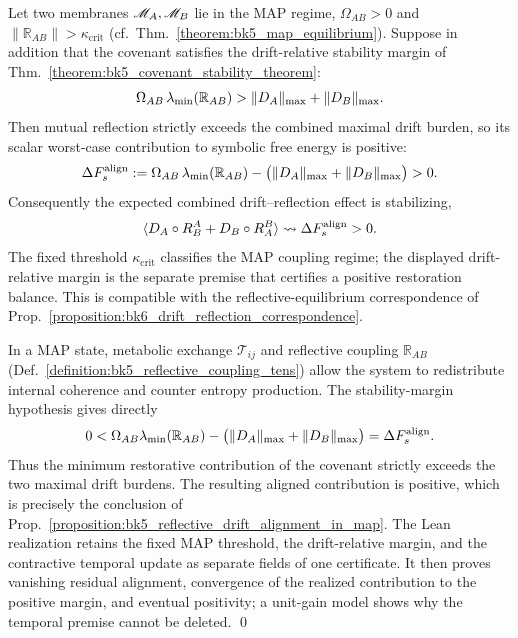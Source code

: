 \begin{proposition}
\label{proposition:bk5_reflective_drift_alignment_in_map}
Let two membranes $\mathscr{M}_A,\mathscr{M}_B$ lie in the MAP regime,
$\Omega_{AB}>0$ and $\|\mathbb{R}_{AB}\|>\kappa_{\mathrm{crit}}$
(cf.~Thm.~\ref{theorem:bk5_map_equilibrium}).  Suppose in addition that the
covenant satisfies the drift-relative stability margin of
Thm.~\ref{theorem:bk5_covenant_stability_theorem}:
\[
\Omega_{AB}\,\lambda_{\min}(\mathbb{R}_{AB})
>
\|D_A\|_{\max}+\|D_B\|_{\max}.
\]
Then mutual reflection strictly exceeds the combined maximal drift burden, so
its scalar worst-case contribution to symbolic free energy is positive:
\[
\Delta F_s^{\mathrm{align}}
:=\Omega_{AB}\,\lambda_{\min}(\mathbb{R}_{AB})
  -\bigl(\|D_A\|_{\max}+\|D_B\|_{\max}\bigr)>0.
\]
Consequently the expected combined drift--reflection effect is stabilizing,
\[
\langle D_A \circ R_B^A
      + D_B \circ R_A^B \rangle
\leadsto \Delta F_s^{\mathrm{align}}>0.
\]
The fixed threshold $\kappa_{\mathrm{crit}}$ classifies the MAP coupling
regime; the displayed drift-relative margin is the separate premise that
certifies a positive restoration balance.  This is compatible with the
reflective-equilibrium correspondence of
Prop.~\ref{proposition:bk6_drift_reflection_correspondence}.
\end{proposition}

\begin{demonstratio}
\label{demonstratio:bk5_entropy_reduction}
In a MAP state, metabolic exchange $\mathcal{T}_{ij}$ and reflective coupling
$\mathbb{R}_{AB}$ (Def.~\ref{definition:bk5_reflective_coupling_tens}) allow
the system to redistribute internal coherence and counter entropy production.
The stability-margin hypothesis gives directly
\[
0<\Omega_{AB}\lambda_{\min}(\mathbb{R}_{AB})
 -\bigl(\|D_A\|_{\max}+\|D_B\|_{\max}\bigr)
 =\Delta F_s^{\mathrm{align}}.
\]
Thus the minimum restorative contribution of the covenant strictly exceeds
the two maximal drift burdens.  The resulting aligned contribution is
positive, which is precisely the conclusion of
Prop.~\ref{proposition:bk5_reflective_drift_alignment_in_map}.
The Lean realization retains the fixed MAP threshold, the drift-relative margin,
and the contractive temporal update as separate fields of one certificate.  It
then proves vanishing residual alignment, convergence of the realized
contribution to the positive margin, and eventual positivity; a unit-gain model
shows why the temporal premise cannot be deleted.
\qed
\end{demonstratio}

